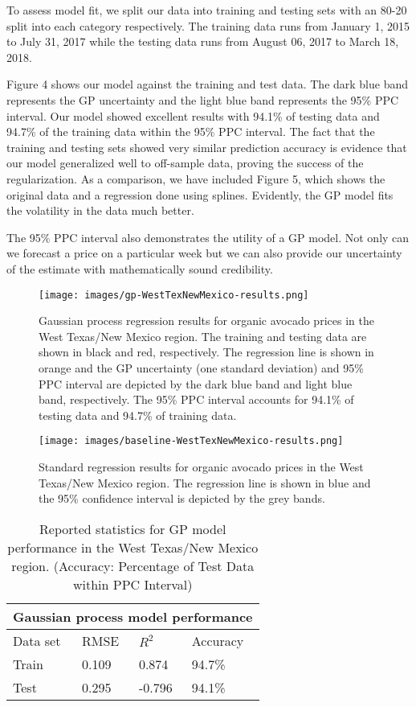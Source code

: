 \documentclass{article}
\newcommand{\outOfCIPtcTrain}{94.7\%}
\newcommand{\outOfCIPtcTest}{94.1\%}
\begin{document}
To assess model fit, we split our data into training and testing sets with an 80-20 split into each category respectively. The training data runs from January 1, 2015 to July 31, 2017 while the testing data runs from August 06, 2017 to March 18, 2018.

Figure 4 shows our model against the training and test data. The dark blue band represents the GP uncertainty and the light blue band represents the 95\% PPC interval. Our model showed excellent results with \outOfCIPtcTest{} of testing data and \outOfCIPtcTrain{} of the training data within the 95\% PPC interval. The fact that the training and testing sets showed very similar prediction accuracy is evidence that our model generalized well to off-sample data, proving the success of the regularization. As a comparison, we have included Figure 5, which shows the original data and a regression done using splines. Evidently, the GP model fits the volatility in the data much better.

The 95\% PPC interval also demonstrates the utility of a GP model. Not only can we forecast a price on a particular week but we can also provide our uncertainty of the estimate with mathematically sound credibility. 

\begin{figure}[h!]
  \centering
  \texttt{[image: images/gp-WestTexNewMexico-results.png]}
  \caption{Gaussian process regression results for organic avocado prices in the West Texas/New Mexico region. The training and testing data are shown in black and red, respectively. The regression line is shown in orange and the GP uncertainty (one standard deviation) and 95\% PPC interval are depicted by the dark blue band and light blue band, respectively. The 95\% PPC interval accounts for \outOfCIPtcTest{} of testing data and \outOfCIPtcTrain{} of training data.}
\end{figure}

\begin{figure}[h!]
  \centering
  \texttt{[image: images/baseline-WestTexNewMexico-results.png]}
  \caption{Standard regression results for organic avocado prices in the West Texas/New Mexico region. The regression line is shown in blue and the 95\% confidence interval is depicted by the grey bands.}
\end{figure}

\begin{table}[h!]
\centering
\begin{tabular}{ |p{2cm}||p{2cm}|p{2cm}|p{2cm}| }
 \hline
 \multicolumn{4}{|c|}{Gaussian process model performance} \\
 \hline
 Data set& RMSE & $R^2$ & Accuracy\\
 \hline
 Train &  0.109  &  0.874  & \outOfCIPtcTrain{} \\
 Test  &  0.295  & -0.796  & \outOfCIPtcTest{} \\
 \hline
\end{tabular}
\caption{Reported statistics for GP model performance in the West Texas/New Mexico region. (Accuracy: Percentage of Test Data within PPC Interval)}
\end{table}
\end{document}
